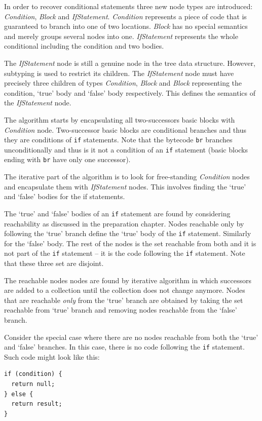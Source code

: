 \documentclass[12pt,twoside,notitlepage]{report}
\begin{document}
In order to recover conditional statements three new node types
are introduced: \emph{Condition}, \emph{Block} and \emph{IfStatement}.
\emph{Condition} represents a piece of code that is guaranteed to 
branch into one of two locations.  \emph{Block} has no special
semantics and merely groups several nodes into one.
\emph{IfStatement} represents the whole conditional including
the condition and two bodies.

The \emph{IfStatement} node is still a genuine node in the tree
data structure.  However, subtyping is used to restrict its children.
The \emph{IfStatement} node must have precisely three children
of types \emph{Condition}, \emph{Block} and \emph{Block} representing
the condition, `true' body and `false' body respectively.
This defines the semantics of the \emph{IfStatement} node.

The algorithm starts by encapsulating all two-successors basic blocks 
with \emph{Condition} node.  Two-successor basic blocks are conditional
branches and thus they are conditions of \verb|if| statements.
Note that the bytecode \verb|br| branches unconditionally and thus
is it not a condition of an \verb|if| statement (basic blocks ending
with \verb|br| have only one successor).

The iterative part of the algorithm is to look for free-standing
\emph{Condition} nodes and encapsulate them with \emph{IfStatement} nodes.
This involves finding the `true' and `false' bodies for the if statements.

The `true' and `false' bodies of an \verb|if| statement are found by
considering reachability as discussed in the preparation chapter.
Nodes reachable only by following the `true' branch define the `true'
body of the \verb|if| statement.  Similarly for the `false' body.
The rest of the nodes is the set reachable from both and it is not
part of the \verb|if| statement -- it is the code following the 
\verb|if| statement.  Note that these three set are disjoint.

The reachable nodes nodes are found by iterative algorithm in 
which successors are added to a collection until the collection
does not change anymore.
Nodes that are reachable \emph{only} from the `true' branch are 
obtained by taking the set reachable from `true' branch and removing
nodes reachable from the `false' branch.

Consider the special case where there are no nodes reachable from both
the `true' and `false' branches.  In this case, there is no code 
following the \verb|if| statement.  Such code might look like this:
\begin{verbatim}
if (condition) {
  return null;
} else {
  return result;
}
\end{verbatim}
\end{document}
